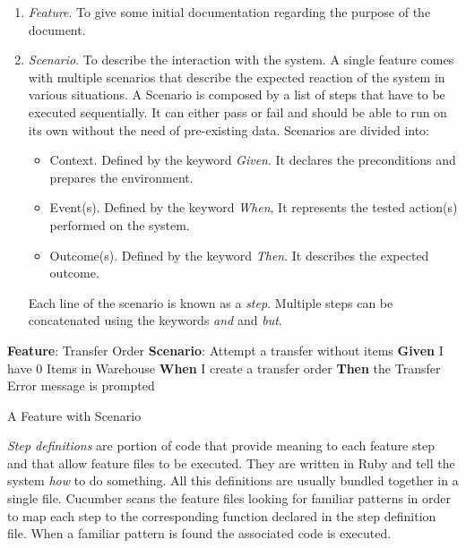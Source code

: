 \begin{enumerate}
  \item \textit{Feature}. To give some initial documentation regarding the purpose of the document.
  \item \textit{Scenario}. To describe the interaction with the system. A single feature comes with multiple scenarios that describe the expected reaction of the system in various situations. A Scenario is composed by a list of steps that have to be executed sequentially. It can either pass or fail and should be able to run on its own without the need of pre-existing data. Scenarios are divided into:
  \begin{itemize}
    \item Context. Defined by the keyword \textit{Given}. It declares the preconditions and prepares the environment.
    \item Event(s). Defined by the keyword \textit{When}, It represents the tested action(s) performed on the system.
    \item Outcome(s). Defined by the keyword \textit{Then}. It describes the expected outcome.
  \end{itemize}
  
  Each line of the scenario is known as a \textit{step}. Multiple steps can be concatenated using the keywords \textit{and} and \textit{but}.
\end{enumerate}

\begin{algorithm}[H]
\SetAlgoLined
\textbf{Feature}: Transfer Order\;
    \hspace{5mm} \textbf{Scenario}: Attempt a transfer without items\;
        \hspace{10mm} \textbf{Given} I have 0 Items in Warehouse\;
        \hspace{10mm} \textbf{When} I create a transfer order\;
        \hspace{10mm} \textbf{Then} the Transfer Error message is prompted\;
\caption{A Feature with Scenario}
\label{alg:featureWithScenario}
\end{algorithm}


\textit{Step definitions} are portion of code that provide meaning to each feature step and that allow feature files to be executed. They are written in Ruby and tell the system \textit{how} to do something. All this definitions are usually bundled together in a single file. Cucumber scans the feature files looking for familiar patterns in order to map each step to the corresponding function declared in the step definition file. When a familiar pattern is found the associated code is executed. 
